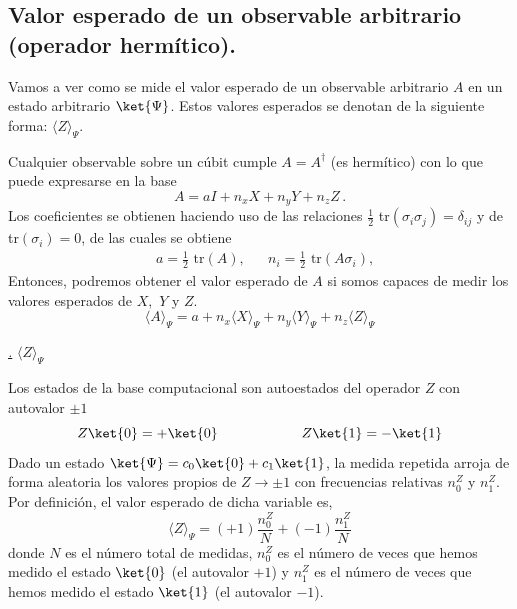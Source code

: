 \documentclass[a4paper,11pt]{book} %
\numberwithin{equation}{chapter}
\def\subsubiContadorIt{\par\addtocounter{subsubsection}{1}\underline{\it\thesubsubsection.}\hskip0.5cm \setcounter{subsubsubsectionIt}{0}}
\newcommand{\SubsubiIt}[1]{
		\subsubiContadorIt \textit{#1}
	}
\newcounter{subsubsubsectionIt}[subsubsection]
\begin{document}
	    \subsection{Valor esperado de un observable arbitrario (operador hermítico). }
	    
Vamos a ver como se mide el valor esperado de un observable arbitrario $A$ en un estado arbitrario $\ket{\Psi}$. Estos valores esperados se denotan de la siguiente forma: $\langle Z \rangle_\Psi$. 

Cualquier observable sobre un cúbit cumple $A = A^\dagger$ (es hermítico) con lo que puede expresarse en la base
	\begin{equation} \label{ec_medidas1_expansion_A_en_Paulis}
	A = a I + n_x X + n_y Y  + n_z Z \, .
	\end{equation}
Los coeficientes se obtienen haciendo uso de las relaciones $\frac{1}{2}$ tr$ (\sigma_i \sigma_j) = \delta_{ij}$ y de tr$(\sigma_i)=0$, de las cuales se obtiene
	\begin{equation} 
\begin{aligned}
	&\boxed{a  = \frac{1}{2} \text{ tr}(A)},        &         &\boxed{n_i = \frac{1}{2} \text{ tr}  (A \sigma_i)},
	\end{aligned}
\end{equation} 
Entonces, podremos obtener el valor esperado de $A$  si somos capaces de medir los valores esperados de $X,$ $Y$ y $Z$.
	\begin{equation}
	\boxed{\langle A\rangle_\Psi = a + n_x \langle X\rangle_\Psi + n_y \langle Y\rangle_\Psi + n_z \langle Z\rangle_\Psi}
	\end{equation}

	 
			\SubsubiIt{$\langle Z \rangle_\Psi$} 
			
Los estados de la base computacional son autoestados del operador $Z$ con autovalor $\pm 1$
\begin{equation}
Z \ket{0} =+ \ket{0}   ~~~~~~~~ ~~~~~~~~~~ Z \ket{1} =-\ket{1} 
\end{equation}
Dado un estado $\ket{\Psi} = c_0\ket{0} + c_1\ket{1}$, la medida repetida arroja de forma aleatoria los valores propios de $Z \to \pm 1$ con frecuencias relativas $n^Z_{0} $ y $n^Z_{1}$. Por definición, el valor esperado de dicha variable es, 
	\begin{equation} \label{ec_medidas1_valor_esperado_Z}
	\boxed{\langle Z \rangle_\Psi = (+1)\frac{n^Z_{0}}{N}+ (-1) \frac{ n^Z_{1}}{N}}
	\end{equation}
donde $N$ es el número total de medidas, $n_{0}^Z$ es el número de veces que hemos medido el estado $\ket{0}$ (el autovalor $+1$) y $n_{1}^Z$ es el número de veces que hemos medido el estado $\ket{1}$ (el autovalor $-1$).
\end{document}
